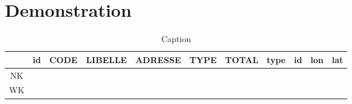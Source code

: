 \section{Demonstration}\label{sec:demonstration}




\begin{table}[]
    \centering
    \begin{tabular}{|c|c|c|c|c|c|c|c|c|c|c|}
        \hline
         & id & CODE & LIBELLE & ADRESSE & TYPE & TOTAL & type & id & lon & lat \\
        \hline
        NK & & & & & & & & & & \\
        \hline
        WK & & & & & & & & & & \\
        \hline
    \end{tabular}
    \caption{Caption}
    \label{tab:my_label}
\end{table}